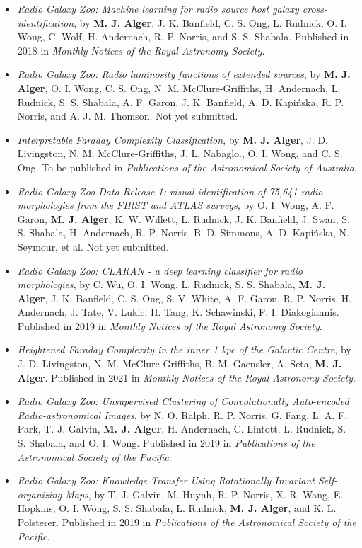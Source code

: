 \begin{itemize}
    \item \emph{Radio Galaxy Zoo: Machine learning for radio source host galaxy cross-identification}, by \textbf{M. J. Alger}, J. K. Banfield, C. S. Ong, L. Rudnick, O. I. Wong, C. Wolf, H. Andernach, R. P. Norris, and S. S. Shabala. Published in 2018 in \emph{Monthly Notices of the Royal Astronomy Society}.
    \item \emph{Radio Galaxy Zoo: Radio luminosity functions of extended sources}, by \textbf{M. J. Alger}, O. I. Wong, C. S. Ong, N. M. McClure-Griffiths, H. Andernach, L. Rudnick, S. S. Shabala, A. F. Garon, J. K. Banfield, A. D. Kapi\'nska, R. P. Norris, and A. J. M. Thomson. Not yet submitted.
    \item \emph{Interpretable Faraday Complexity Classification}, by \textbf{M. J. Alger}, J. D. Livingston, N. M. McClure-Griffiths, J. L. Nabaglo., O. I. Wong, and C. S. Ong. To be published in \emph{Publications of the Astronomical Society of Australia}.
    \item \emph{Radio Galaxy Zoo Data Release 1: visual identification of 75,641 radio morphologies from the FIRST and ATLAS surveys}, by O. I. Wong, A. F. Garon, \textbf{M. J. Alger}, K. W. Willett, L. Rudnick, J. K. Banfield, J. Swan, S. S. Shabala, H. Andernach, R. P. Norris, B. D. Simmons, A. D. Kapi\'nska, N. Seymour, et al. Not yet submitted.
    \item \emph{Radio Galaxy Zoo: CLARAN - a deep learning classifier for radio morphologies}, by C. Wu, O. I. Wong, L. Rudnick, S. S. Shabala, \textbf{M. J. Alger}, J. K. Banfield, C. S. Ong, S. V. White, A. F. Garon, R. P. Norris, H. Andernach, J. Tate, V. Lukic, H. Tang, K. Schawinski, F. I. Diakogiannis. Published in 2019 in \emph{Monthly Notices of the Royal Astronomy Society}.
    \item \emph{Heightened Faraday Complexity in the inner 1 kpc of the Galactic Centre}, by J. D. Livingston, N. M. McClure-Griffiths, B. M. Gaensler, A. Seta, \textbf{M. J. Alger}. Published in 2021 in \emph{Monthly Notices of the Royal Astronomy Society}.
    \item \emph{Radio Galaxy Zoo: Unsupervised Clustering of Convolutionally Auto-encoded Radio-astronomical Images}, by N. O. Ralph, R. P. Norris, G. Fang, L. A. F. Park, T. J. Galvin, \textbf{M. J. Alger}, H. Andernach, C. Lintott, L. Rudnick, S. S. Shabala, and O. I. Wong. Published in 2019 in \emph{Publications of the Astronomical Society of the Pacific}.
    \item \emph{Radio Galaxy Zoo: Knowledge Transfer Using Rotationally Invariant Self-organizing Maps}, by T. J. Galvin, M. Huynh, R. P. Norris, X. R. Wang, E. Hopkins, O. I. Wong, S. S. Shabala, L. Rudnick, \textbf{M. J. Alger}, and K. L. Polsterer. Published in 2019 in \emph{Publications of the Astronomical Society of the Pacific}.
\end{itemize}
